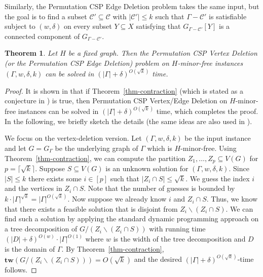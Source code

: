 \documentclass[a4paper,11pt]{article}
\numberwithin{lemma}{section}
\newtheorem{theorem}[lemma]{Theorem}
\newcommand{\tw}{\mathbf{tw}}
\begin{document}
Similarly, the {\sc Permutation CSP Edge Deletion} problem takes the same input, but the goal is to find a subset $\mathcal{C}' \subseteq \mathcal{C}$ with $|\mathcal{C}'| \leq k$ such that $\varGamma - \mathcal{C}'$ is satisfiable subject to $(w,\delta)$ on every subset $Y \subseteq X$ satisfying that $G_{\varGamma - \mathcal{C}'}[Y]$ is a connected component of $G_{\varGamma - \mathcal{C}'}$.

\begin{theorem}\label{thm-permCSP}
 Let $H$ be a fixed graph.
 Then the {\sc Permutation CSP Vertex Deletion} (or the {\sc Permutation CSP Edge Deletion}) problem on $H$-minor-free instances $(\varGamma,w,\delta,k)$ can be solved in $(|\varGamma|+\delta)^{O(\sqrt{k})}$ time.
\end{theorem}

\begin{proof}
 It is shown in \cite{MarxMNT22} that if Theorem~\ref{thm-contraction} (which is stated as a conjecture in \cite{MarxMNT22}) is true, then {\sc Permutation CSP Vertex/Edge Deletion} on $H$-minor-free instances can be solved in $(|\varGamma|+\delta)^{O(\sqrt{k})}$ time, which completes the proof.
 In the following, we briefly sketch the details  (the same ideas are also used in \cite{BandyapadhyayLLSJ22}).

 We focus on the vertex-deletion version.
 Let $(\varGamma,w,\delta,k)$ be the input instance and let $G = G_\varGamma$ be the underlying graph of $\varGamma$ which is $H$-minor-free.
 Using Theorem~\ref{thm-contraction}, we can compute the partition $Z_1,\dots,Z_p \subseteq V(G)$ for $p = \lceil\sqrt{k}\rceil$.
 Suppose $S \subseteq V(G)$ is an unknown solution for $(\varGamma,w,\delta,k)$.
 Since $|S| \leq k$ there exists some $i \in [p]$ such that $|Z_i \cap S| \leq \sqrt{k}$.
 We guess the index $i$ and the vertices in $Z_i \cap S$.
 Note that the number of guesses is bounded by $k \cdot |\varGamma|^{\sqrt{k}} = |\varGamma|^{O(\sqrt{k})}$.
 Now suppose we already know $i$ and $Z_i \cap S$.
 Thus, we know that there exists a feasible solution that is disjoint from $Z_i \backslash (Z_i \cap S)$.
 We can find such a solution by applying the standard dynamic programming approach on a tree decomposition of $G/(Z_i \backslash (Z_i \cap S))$ with running time $(|D|+\delta)^{O(w)} \cdot |\varGamma|^{O(1)}$ where $w$ is the width of the tree decomposition and $D$ is the domain of $\varGamma$.
 By Theorem~\ref{thm-contraction}, $\tw(G/(Z_i \backslash (Z_i \cap S))) = O(\sqrt{k})$ and the desired $(|\varGamma|+\delta)^{O(\sqrt{k})}$-time follows.


\end{proof}
\end{document}
